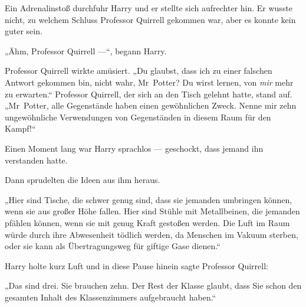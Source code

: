 Ein Adrenalinstoß durchfuhr Harry und er stellte sich aufrechter hin. Er wusste nicht, zu welchem Schluss Professor Quirrell gekommen war, aber es konnte kein guter sein.

„Ähm, Professor Quirrell —“, begann Harry.

Professor Quirrell wirkte amüsiert.
„Du glaubst, dass ich zu einer falschen Antwort gekommen bin, nicht wahr, Mr~Potter? Du wirst lernen, von \emph{mir} mehr zu erwarten.“ Professor Quirrell, der sich an den Tisch gelehnt hatte, stand auf.
„Mr~Potter, alle Gegenstände haben einen gewöhnlichen Zweck. Nenne mir zehn ungewöhnliche Verwendungen von Gegenständen in diesem Raum für den Kampf!“

Einen Moment lang war Harry sprachlos — geschockt, dass jemand ihn verstanden hatte.

Dann sprudelten die Ideen aus ihm heraus.

„Hier sind Tische, die schwer genug sind, dass sie jemanden umbringen können, wenn sie aus großer Höhe fallen. Hier sind Stühle mit Metallbeinen, die jemanden pfählen können, wenn sie mit genug Kraft gestoßen werden. Die Luft im Raum würde durch ihre Abwesenheit tödlich werden, da Menschen im Vakuum sterben, oder sie kann als Übertragungsweg für giftige Gase dienen.“

Harry holte kurz Luft und in diese Pause hinein sagte Professor Quirrell:

„Das sind drei. Sie brauchen zehn. Der Rest der Klasse glaubt, dass Sie schon den gesamten Inhalt des Klassenzimmers aufgebraucht haben.“

